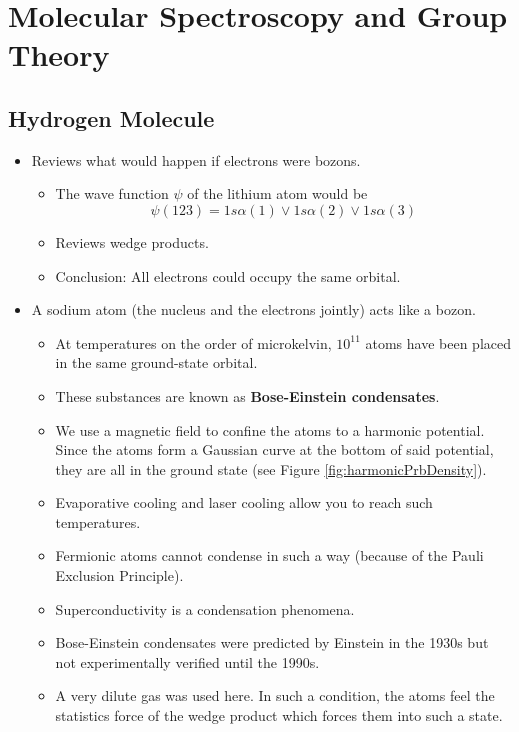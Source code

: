 \documentclass[../notes.tex]{subfiles}
\begin{document}
\chapter{Molecular Spectroscopy and Group Theory}
\section{Hydrogen Molecule}
\begin{itemize}
    \item {}Reviews what would happen if electrons were bozons.
    \begin{itemize}
        \item The wave function $\psi$ of the lithium atom would be
        \begin{equation*}
            \psi(123) = 1s\alpha(1)\vee 1s\alpha(2)\vee 1s\alpha(3)
        \end{equation*}
        \item Reviews wedge products.
        \item Conclusion: All electrons could occupy the same orbital.
    \end{itemize}
    \item A sodium atom (the nucleus and the electrons jointly) acts like a bozon.
    \begin{itemize}
        \item At temperatures on the order of microkelvin, $10^{11}$ atoms have been placed in the same ground-state orbital.
        \item These substances are known as \textbf{Bose-Einstein condensates}.
        \item We use a magnetic field to confine the atoms to a harmonic potential. Since the atoms form a Gaussian curve at the bottom of said potential, they are all in the ground state (see Figure \ref{fig:harmonicPrbDensity}).
        \item Evaporative cooling and laser cooling allow you to reach such temperatures.
        \item Fermionic atoms cannot condense in such a way (because of the Pauli Exclusion Principle).
        \item Superconductivity is a condensation phenomena.
        \item Bose-Einstein condensates were predicted by Einstein in the 1930s but not experimentally verified until the 1990s.
        \item A very dilute gas was used here. In such a condition, the atoms feel the statistics force of the wedge product which forces them into such a state.

\end{itemize}
\end{itemize}
\end{document}
